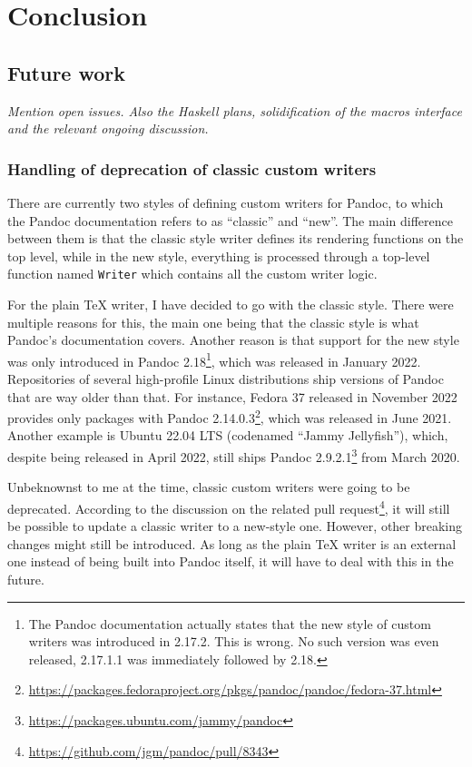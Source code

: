 \documentclass[
  digital,     %
  oneside,     %
  nosansbold,  %
  nocolorbold, %
  lof,         %
  lot,         %
]{fithesis4}
\begin{document}
\chapter{Conclusion}
\section{Future work}
\emph{Mention open issues. Also the Haskell plans, solidification of the macros interface and the relevant ongoing discussion.}

\subsection{Handling of deprecation of classic custom writers}

There are currently two styles of defining custom writers for Pandoc, to which the Pandoc documentation refers to as ``classic'' and ``new''. The main difference between them is that the classic style writer defines its rendering functions on the top level, while in the new style, everything is processed through a top-level function named \texttt{Writer} which contains all the custom writer logic.

For the plain \TeX{} writer, I have decided to go with the classic style. There were multiple reasons for this, the main one being that the classic style is what Pandoc's documentation covers. Another reason is that support for the new style was only introduced in Pandoc 2.18\footnote{The Pandoc documentation actually states that the new style of custom writers was introduced in 2.17.2. This is wrong. No such version was even released, 2.17.1.1 was immediately followed by 2.18.}, which was released in January 2022. Repositories of several high-profile Linux distributions ship versions of Pandoc that are way older than that. For instance, Fedora 37 released in November 2022 provides only packages with Pandoc 2.14.0.3\footnote{\url{https://packages.fedoraproject.org/pkgs/pandoc/pandoc/fedora-37.html}}, which was released in June 2021. Another example is Ubuntu 22.04 LTS (codenamed ``Jammy Jellyfish''), which, despite being released in April 2022, still ships Pandoc 2.9.2.1\footnote{\url{https://packages.ubuntu.com/jammy/pandoc}} from March 2020.

Unbeknownst to me at the time, classic custom writers were going to be deprecated. According to the discussion on the related pull request\footnote{\url{https://github.com/jgm/pandoc/pull/8343}}, it will still be possible to update a classic writer to a new-style one. However, other breaking changes might still be introduced. As long as the plain \TeX{} writer is an external one instead of being built into Pandoc itself, it will have to deal with this in the future.
\end{document}
